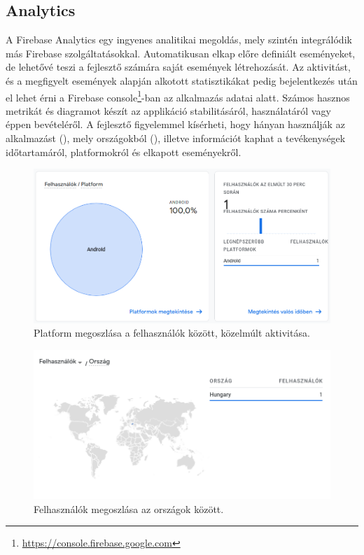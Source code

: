 \subsection{Analytics}
A Firebase Analytics egy ingyenes analitikai megoldás, mely szintén integrálódik más Firebase szolgáltatásokkal. Automatikusan elkap előre definiált eseményeket, de lehetővé teszi a fejlesztő számára saját események létrehozását. Az aktivitást, és a megfigyelt események alapján alkotott statisztikákat pedig bejelentkezés után el lehet érni a Firebase console\footnote{\url{https://console.firebase.google.com}}-ban az alkalmazás adatai alatt. \cite{Analytics} Számos hasznos metrikát és diagramot készít az applikáció stabilitásáról, használatáról vagy éppen bevételéről. A fejlesztő figyelemmel kísérheti, hogy hányan használják az alkalmazást (), mely országokból (), illetve információt kaphat a tevékenységek időtartamáról, platformokról és elkapott eseményekről. 

\begin{figure}[!ht]
	\centering
	\includegraphics[width=150mm, keepaspectratio]{figures/analytics_platform.png}
	\caption{Platform megoszlása a felhasználók között, közelmúlt aktivitása.}
	\label{fig:AnalyticsPlatform}
\end{figure}

\begin{figure}[!ht]
	\centering
	\includegraphics[width=150mm, keepaspectratio]{figures/analytics_countries.png}
	\caption{Felhasználók megoszlása az országok között.}
	\label{fig:AnalyticsCountries}
\end{figure}

